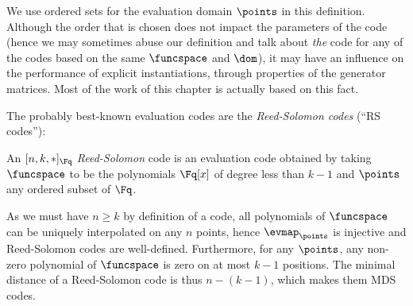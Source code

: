 We use ordered sets for the evaluation domain $\points$ in this definition. Although the order that is chosen does not impact the parameters of the code (hence we
may sometimes abuse our definition and talk about \emph{the} code for any of the codes based on the same $\funcspace$ and $\dom$), it may have
an influence on the performance of explicit instantiations, through \eg properties of the generator matrices. Most of the work
of this chapter is actually based on this fact.

The probably best-known evaluation codes are the \emph{Reed-Solomon codes} (``RS codes''):

\begin{defi}
An $[n,k,\ast]_{\Fq}$ \emph{Reed-Solomon} code is an evaluation code obtained by taking $\funcspace$ to be the polynomials $\Fq[x]$
of degree less than $k-1$ and $\points$ any ordered subset of $\Fq$. 
\end{defi}

As we must have $n \geq k$ by definition of a code, all polynomials of $\funcspace$
can be uniquely interpolated on any $n$ points, hence $\evmap_\points$ is injective and Reed-Solomon codes are well-defined.
Furthermore, for any $\points$, any non-zero polynomial of $\funcspace$ is zero on at most $k - 1$ positions. The minimal distance of a Reed-Solomon code is thus $n - (k - 1)$, which makes them MDS codes.



